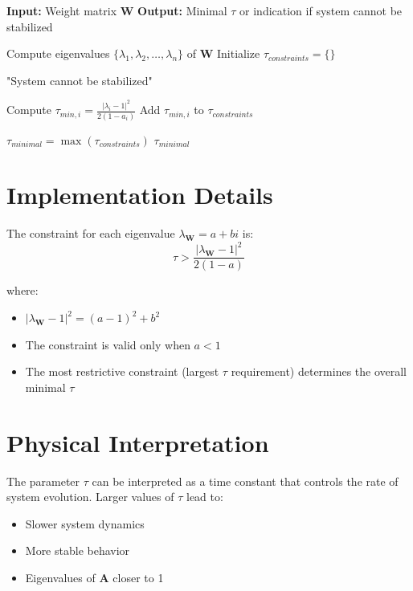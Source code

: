 \documentclass[11pt]{article}
\begin{document}
\begin{algorithm}
\caption{Minimal Tau Estimation}
\begin{algorithmic}[1]
\STATE \textbf{Input:} Weight matrix $\mathbf{W}$
\STATE \textbf{Output:} Minimal $\tau$ or indication if system cannot be stabilized

\STATE Compute eigenvalues $\{\lambda_1, \lambda_2, \ldots, \lambda_n\}$ of $\mathbf{W}$
\STATE Initialize $\tau_{constraints} = \{\}$

        \RETURN "System cannot be stabilized"
    \ENDIF
    
    \STATE Compute $\tau_{min,i} = \frac{|\lambda_i - 1|^2}{2(1 - a_i)}$
    \STATE Add $\tau_{min,i}$ to $\tau_{constraints}$
\ENDFOR

\STATE $\tau_{minimal} = \max(\tau_{constraints})$
\RETURN $\tau_{minimal}$
\end{algorithmic}
\end{algorithm}

\section{Implementation Details}

The constraint for each eigenvalue $\lambda_{\mathbf{W}} = a + bi$ is:
\begin{equation}
\tau > \frac{|\lambda_{\mathbf{W}} - 1|^2}{2(1 - a)}
\end{equation}

where:
\begin{itemize}
    \item $|\lambda_{\mathbf{W}} - 1|^2 = (a - 1)^2 + b^2$
    \item The constraint is valid only when $a < 1$
    \item The most restrictive constraint (largest $\tau$ requirement) determines the overall minimal $\tau$
\end{itemize}

\section{Physical Interpretation}

The parameter $\tau$ can be interpreted as a time constant that controls the rate of system evolution. Larger values of $\tau$ lead to:
\begin{itemize}
    \item Slower system dynamics
    \item More stable behavior
    \item Eigenvalues of $\mathbf{A}$ closer to 1
\end{itemize}
\end{document}
